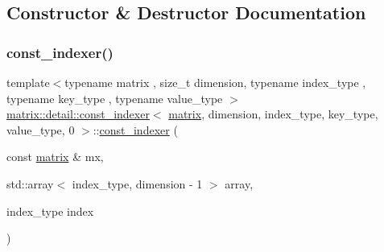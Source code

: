 \subsection{Constructor \& Destructor Documentation}
\mbox{\label{structmatrix_1_1detail_1_1const__indexer_3_01matrix_00_01dimension_00_01index__type_00_01key__type_00_01value__type_00_010_01_4_a90d5070efaa89ac38a8a8d3cdc2d2ff6}} 
\subsubsection{\texorpdfstring{const\+\_\+indexer()}{const\_indexer()}}
{\footnotesize\ttfamily template$<$typename matrix , size\+\_\+t dimension, typename index\+\_\+type , typename key\+\_\+type , typename value\+\_\+type $>$ \\
\hyperlink{structmatrix_1_1detail_1_1const__indexer}{matrix\+::detail\+::const\+\_\+indexer}$<$ \hyperlink{structmatrix_1_1matrix}{matrix}, dimension, index\+\_\+type, key\+\_\+type, value\+\_\+type, 0 $>$\+::\hyperlink{structmatrix_1_1detail_1_1const__indexer}{const\+\_\+indexer} (\begin{DoxyParamCaption}\item[{const \hyperlink{structmatrix_1_1matrix}{matrix} \&}]{mx,  }\item[{std\+::array$<$ index\+\_\+type, dimension -\/ 1 $>$}]{array,  }\item[{index\+\_\+type}]{index }\end{DoxyParamCaption})\hspace{0.3cm}{\ttfamily [inline]}}



